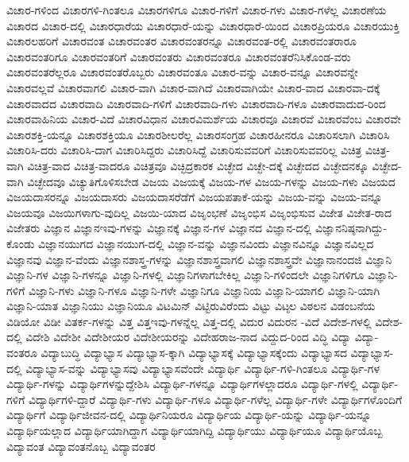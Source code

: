 {ವಿಚಾರ-ಗಳಿಂದ
ವಿಚಾರಗಳಿ-ಗಿಂತಲೂ
ವಿಚಾರಗಳಿಗೂ
ವಿಚಾರ-ಗಳಿಗೆ
ವಿಚಾರ-ಗಳು
ವಿಚಾರ-ಗಳೆಲ್ಲ
ವಿಚಾರಣೆಯ
ವಿಚಾರದ
ವಿಚಾರ-ದಲ್ಲಿ
ವಿಚಾರಧಾರೆಯ
ವಿಚಾರಧಾರೆ-ಯನ್ನು
ವಿಚಾರಧಾರೆ-ಯಿಂದ
ವಿಚಾರಪ್ರಿಯರೂ
ವಿಚಾರಯುಕ್ತಿ
ವಿಚಾರಲಹರಿಗೆ
ವಿಚಾರವಂತ
ವಿಚಾರವಂತರ
ವಿಚಾರವಂತರನ್ನೂ
ವಿಚಾರವಂತ-ರಲ್ಲಿ
ವಿಚಾರವಂತರಾರೂ
ವಿಚಾರವಂತರಿಗೂ
ವಿಚಾರವಂತರಿಗೆ
ವಿಚಾರವಂತರು
ವಿಚಾರವಂತರೂ
ವಿಚಾರವಂತರೆನಿಸಿಕೊಂಡ-ವರು
ವಿಚಾರವಂತರೆಲ್ಲರೂ
ವಿಚಾರವಂತರೊಬ್ಬರು
ವಿಚಾರವಂತೂ
ವಿಚಾರ-ವನ್ನು
ವಿಚಾರ-ವನ್ನೂ
ವಿಚಾರವನ್ನೇ
ವಿಚಾರವಲ್ಲವೆ
ವಿಚಾರವಾಗಲಿ
ವಿಚಾರ-ವಾಗಿ
ವಿಚಾರ-ವಾಗಿದೆ
ವಿಚಾರವಾಗಿಯೇ
ವಿಚಾರ-ವಾದ
ವಿಚಾರವಾ-ದಕ್ಕೆ
ವಿಚಾರವಾದದ
ವಿಚಾರವಾದಿ
ವಿಚಾರವಾದಿ-ಗಳಿಗೆ
ವಿಚಾರವಾದಿ-ಗಳು
ವಿಚಾರವಾದಿ-ಗಳೂ
ವಿಚಾರವಾದುದ-ರಿಂದ
ವಿಚಾರವಾಹಿನಿಯ
ವಿಚಾರ-ವಿದೆ
ವಿಚಾರವಿಧಾನ
ವಿಚಾರವಿಮರ್ಶೆಯ
ವಿಚಾರವೂ
ವಿಚಾರವೆ
ವಿಚಾರವೆಂಬ
ವಿಚಾರವೇ
ವಿಚಾರಶಕ್ತಿ-ಯನ್ನೂ
ವಿಚಾರಶಕ್ತಿಯೂ
ವಿಚಾರಶೀಲರೆಲ್ಲ
ವಿಚಾರಸಂಗ್ರಹ
ವಿಚಾರಹೀನರೂ
ವಿಚಾರಿಸಲಾಗಿ
ವಿಚಾರಿಸಿ
ವಿಚಾರಿಸಿ-ದರು
ವಿಚಾರಿಸಿ-ದಾಗ
ವಿಚಾರಿಸಿದ್ದರು
ವಿಚಾರಿಸಿದ್ದೆ
ವಿಚಾರಿಸುವವರಿಗೆ
ವಿಚಾರಿಸುವವರಿಲ್ಲ
ವಿಚಿತ್ರ
ವಿಚಿತ್ರ-ವಾಗಿ
ವಿಚಿತ್ರ-ವಾದ
ವಿಚಿತ್ರ-ವಾದರೂ
ವಿಚಿತ್ರವೂ
ವಿಚ್ಛಿದ್ರಕಾರಕ
ವಿಚ್ಛೇದ
ವಿಚ್ಛೇ-ದಕ್ಕೆ
ವಿಚ್ಛೇದದ
ವಿಚ್ಛೇದನಕ್ಕೂ
ವಿಚ್ಛೇದ-ವಾಗಿ
ವಿಚ್ಛೇದವೂ
ವಿಚ್ಯುತಿಗೊಳಿಸಬೇಡ
ವಿಜಯ
ವಿಜಯಕ್ಕೆ
ವಿಜಯ-ಗಳ
ವಿಜಯ-ಗಳನ್ನು
ವಿಜಯ-ಗಳು
ವಿಜಯದ
ವಿಜಯದಾಸರನ್ನೂ
ವಿಜಯದಾಸರು
ವಿಜಯದಾಸರೆಡೆಗೆ
ವಿಜಯಪತಾಕೆ-ಯನ್ನು
ವಿಜಯ-ವನ್ನು
ವಿಜಯ-ವನ್ನೂ
ವಿಜಯವೂ
ವಿಜಯಿಗಳಾಗು-ವುದಿಲ್ಲ
ವಿಜಯಿ-ಯಾದ
ವಿಜೃಂಭಣೆ
ವಿಜೃಂಭಿಸ
ವಿಜೃಂಭಿಸುವ
ವಿಜೇತ
ವಿಜೇತ-ರಾದ
ವಿಜೇತರು
ವಿಜ್ಞಾನ
ವಿಜ್ಞಾನಇವು-ಗಳನ್ನು
ವಿಜ್ಞಾನಕ್ಕೆ
ವಿಜ್ಞಾನ-ಗಳ
ವಿಜ್ಞಾನದ
ವಿಜ್ಞಾನ-ದಲ್ಲಿ
ವಿಜ್ಞಾನನಿಷ್ಠನಾಗಿದ್ದು-ಕೊಂಡು
ವಿಜ್ಞಾನಯುಗದ
ವಿಜ್ಞಾನಯುಗ-ದಲ್ಲಿ
ವಿಜ್ಞಾನ-ವನ್ನು
ವಿಜ್ಞಾನವಿಂದು
ವಿಜ್ಞಾನವಿನ್ನೂ
ವಿಜ್ಞಾನವಿಲ್ಲದ
ವಿಜ್ಞಾನವು
ವಿಜ್ಞಾನ-ವೆಂದು
ವಿಜ್ಞಾನಶಾಸ್ತ್ರ-ಗಳನ್ನು
ವಿಜ್ಞಾನಶಾಸ್ತ್ರವಾಗಲಿ
ವಿಜ್ಞಾನಶಾಸ್ತ್ರವೇ
ವಿಜ್ಞಾನಾನಂದಜಿ
ವಿಜ್ಞಾನಿ
ವಿಜ್ಞಾನಿ-ಗಳ
ವಿಜ್ಞಾನಿ-ಗಳನ್ನೂ
ವಿಜ್ಞಾನಿ-ಗಳಲ್ಲಿ
ವಿಜ್ಞಾನಿಗಳಾಗಬೇಕಿಲ್ಲ
ವಿಜ್ಞಾನಿ-ಗಳಿಂದಲೇ
ವಿಜ್ಞಾನಿಗಳಿಗೂ
ವಿಜ್ಞಾನಿ-ಗಳಿಗೆ
ವಿಜ್ಞಾನಿ-ಗಳು
ವಿಜ್ಞಾನಿ-ಗಳೂ
ವಿಜ್ಞಾನಿ-ಗಳೇ
ವಿಜ್ಞಾನಿಗೂ
ವಿಜ್ಞಾನಿಯ
ವಿಜ್ಞಾನಿ-ಯಾಗಲಿ
ವಿಜ್ಞಾನಿ-ಯಾಗಿ
ವಿಜ್ಞಾನಿ-ಯಾತ
ವಿಜ್ಞಾನಿಯು
ವಿಜ್ಞಾನಿಯೂ
ವಿಟಮಿನ್
ವಿಟ್ಟಿರುವಿರೆಂದು
ವಿಟ್ಟು
ವಿಟ್ಠಲ
ವಿಠಲನ
ವಿಡಂಬನೆಯ
ವಿಡಿಯೋ
ವಿಡೀ
ವಿತರ್ಕ-ಗಳನ್ನು
ವಿತ್ತ
ವಿತ್ತಇವು-ಗಳನ್ನೆಲ್ಲ
ವಿತ್ತ-ದಲ್ಲಿ
ವಿದುರ
ವಿದುರನ
-ವಿದೆ
ವಿದೇಶ-ಗಳಲ್ಲಿ
ವಿದೇಶ-ದಲ್ಲಿ
ವಿದೇಶಿ
ವಿದೇಶೀ
ವಿದೇಶೀಯರ
ವಿದೇಶೀಯರನ್ನು
ವಿದೇಹರಾಜ-ನಾದ
ವಿದ್ದುದ-ರಿಂದ
ವಿದ್ಧಿ
ವಿದ್ಯಾ
ವಿದ್ಯಾ-ವಂತರೂ
ವಿದ್ಯಾಬುದ್ಧಿ
ವಿದ್ಯಾಭ್ಯಾಸ
ವಿದ್ಯಾಭ್ಯಾಸ-ಕ್ಕಾಗಿ
ವಿದ್ಯಾಭ್ಯಾಸಕ್ಕೆ
ವಿದ್ಯಾಭ್ಯಾಸಕ್ಕೆಂದು
ವಿದ್ಯಾಭ್ಯಾಸದ
ವಿದ್ಯಾಭ್ಯಾಸ-ದಲ್ಲಿ
ವಿದ್ಯಾಭ್ಯಾಸ-ವನ್ನು
ವಿದ್ಯಾಭ್ಯಾಸವು
ವಿದ್ಯಾಭ್ಯಾಸವೆಂದೇ
ವಿದ್ಯಾರ್ಥಿ
ವಿದ್ಯಾರ್ಥಿ-ಗಳಿ-ಗಿಂತಲೂ
ವಿದ್ಯಾರ್ಥಿ-ಗಳ
ವಿದ್ಯಾರ್ಥಿ-ಗಳನ್ನು
ವಿದ್ಯಾರ್ಥಿಗಳನ್ನುದ್ದೇಶಿಸಿ
ವಿದ್ಯಾರ್ಥಿ-ಗಳನ್ನೂ
ವಿದ್ಯಾರ್ಥಿಗಳಲ್ಲಾದರೂ
ವಿದ್ಯಾರ್ಥಿ-ಗಳಲ್ಲಿ
ವಿದ್ಯಾರ್ಥಿ-ಗಳಿಗೆ
ವಿದ್ಯಾರ್ಥಿಗಳಿ-ದ್ದಾರೆ
ವಿದ್ಯಾರ್ಥಿ-ಗಳು
ವಿದ್ಯಾರ್ಥಿ-ಗಳೂ
ವಿದ್ಯಾರ್ಥಿ-ಗಳೆಲ್ಲ
ವಿದ್ಯಾರ್ಥಿ-ಗಳೇ
ವಿದ್ಯಾರ್ಥಿಗಳೊಂದಿಗೆ
ವಿದ್ಯಾರ್ಥಿಗೆ
ವಿದ್ಯಾರ್ಥಿಜೀವನ-ದಲ್ಲಿ
ವಿದ್ಯಾರ್ಥಿನಿಯರೂ
ವಿದ್ಯಾರ್ಥಿಯ
ವಿದ್ಯಾರ್ಥಿ-ಯನ್ನು
ವಿದ್ಯಾರ್ಥಿ-ಯನ್ನೂ
ವಿದ್ಯಾರ್ಥಿಯಲ್ಲಾದ
ವಿದ್ಯಾರ್ಥಿಯಾಗಿದ್ದಾಗ
ವಿದ್ಯಾರ್ಥಿಯಾಗಿದ್ದಿ
ವಿದ್ಯಾರ್ಥಿಯು
ವಿದ್ಯಾರ್ಥಿಯೂ
ವಿದ್ಯಾರ್ಥಿಯೊಬ್ಬ
ವಿದ್ಯಾವಂತ
ವಿದ್ಯಾವಂತನೊಬ್ಬ
ವಿದ್ಯಾವಂತರ
}
